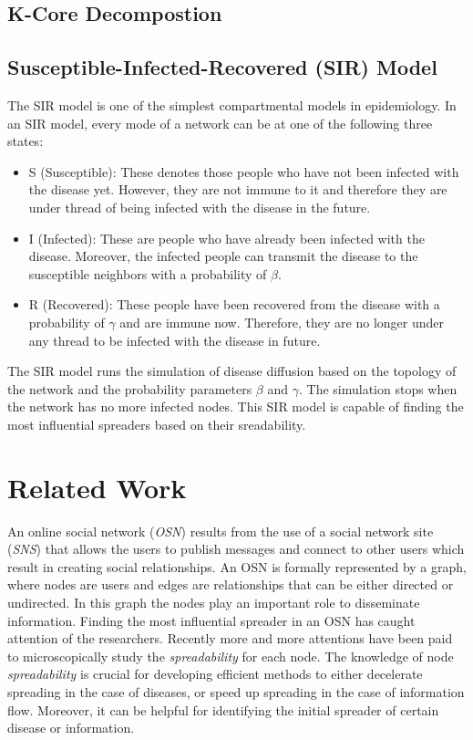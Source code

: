 \documentclass[sigconf]{acmart}
\begin{document}
\subsection{K-Core Decompostion}

\subsection{Susceptible-Infected-Recovered (SIR) Model}
The SIR model is one of the simplest compartmental models in epidemiology. In an SIR model, every mode of a network can be at one of the following three states:
\begin{itemize}
	\item S (Susceptible): These denotes those people who have not been infected with the disease yet. However, they are not immune to it and therefore they are under thread of being infected with the disease in the future.
	\item I (Infected): These are people who have already been infected with the disease. Moreover, the infected people can transmit the disease to the susceptible neighbors with a probability of $\beta$.
	\item R (Recovered): These people have been recovered from the disease with a probability of $\gamma$ and are immune now. Therefore, they are no longer under any thread to be infected with the disease in future.
\end{itemize} 
The SIR model runs the simulation of disease diffusion based on the topology of the network and the probability parameters $\beta$ and $\gamma$. The simulation stops when the network has no more infected nodes. This SIR model is capable of finding the most influential spreaders based on their sreadability. 

\section{Related Work}
An online social network (\emph{OSN}) results from the use of a social network site (\emph{SNS}) that allows the users to publish messages and connect to other users which result in creating social relationships. An OSN is formally represented by a graph, where nodes are users and edges are relationships that can be either directed or undirected. In this graph the nodes play an important role to disseminate information. Finding the most influential spreader in an OSN has caught attention of the researchers. Recently more and more attentions have been paid to microscopically study the \emph{spreadability} for each node. The knowledge of node \emph{spreadability} is crucial for developing efficient methods to either decelerate spreading in the case of diseases, or speed up spreading in the case of information flow. Moreover, it can be helpful for identifying the initial spreader of certain disease or information.
\end{document}
